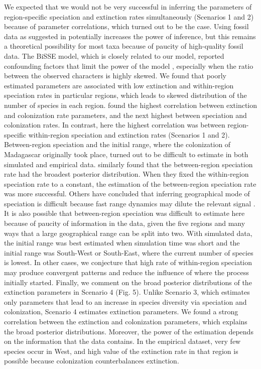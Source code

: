 We expected that we would not be very successful in inferring the parameters of region-specific speciation and extinction rates simultaneously (Scenarios 1 and 2) because of parameter correlations, which turned out to be the case. 
Using fossil data as suggested in \citet{Paradis2004} potentially increases the power of inference, but this remains a theoretical possibility for most taxa because of paucity of high-quality fossil data. 
The BiSSE model, which is closely related to our model, reported confounding factors that limit the power of the model \citep{Davis2013}, especially when the ratio between the observed characters is highly skewed. 
We found that poorly estimated parameters are associated with low extinction and within-region speciation rates in particular regions, which leads to skewed distribution of the number of species in each region. 
\citet{Goldberg2011} found the highest correlation between extinction and colonization rate parameters, and the next highest between speciation and colonization rates. 
In contrast, here the highest correlation was between region-specific within-region speciation and extinction rates (Scenarios 1 and 2). 
Between-region speciation and the initial range, where the colonization of Madagascar originally took place, turned out to be difficult to estimate in both simulated and empirical data. \citet{Goldberg2011} similarly found that the between-region speciation rate had the broadest posterior distribution.  
When they fixed the within-region speciation rate to a constant, the estimation of the between-region speciation rate was more successful. 
Others have concluded that inferring geographical mode of speciation is difficult because fast range dynamics may dilute the relevant signal \citep{Losos2003}. 
It is also possible that between-region speciation was difficult to estimate here because of paucity of information in the data, given the five regions and many ways that a large geographical range can be split into two.  
With simulated data, the initial range was best estimated when simulation time was short and the initial range was South-West or South-East, where the current number of species is lowest. 
In other cases, we conjecture that high rate of within-region speciation may produce convergent patterns and reduce the influence of where the process initially started. 
Finally, we comment on the broad posterior distributions of the extinction parameters in Scenario 4 (Fig. 5). 
Unlike Scenario 3, which estimates only parameters that lead to an increase in species diversity via speciation and colonization, Scenario 4 estimates extinction parameters.  
We found a strong correlation between the extinction and colonization parameters, which explains the  broad posterior distributions.  
Moreover, the power of the estimation depends on the information that the data contains. 
In the empirical dataset, very few species occur in West, and high value of the extinction rate in that region is possible because colonization counterbalances extinction.
   
